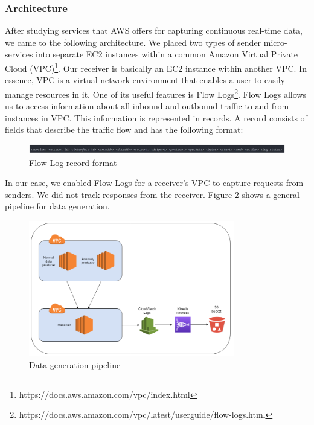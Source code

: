         \subsubsection{Architecture}
        After studying services that AWS offers for capturing continuous real-time data, we came to the following architecture. We placed two types of sender micro-services into separate EC2 instances within a common Amazon Virtual Private Cloud (VPC)\footnote{ https://docs.aws.amazon.com/vpc/index.html}. Our receiver is basically an EC2 instance within another VPC. In essence, VPC is a virtual network environment that enables a user to easily manage resources in it. One of its useful features is Flow Logs\footnote{ https://docs.aws.amazon.com/vpc/latest/userguide/flow-logs.html}. Flow Logs allows us to access information about all inbound and outbound traffic to and from instances in VPC. This information is represented in records. A record  consists of fields that describe the traffic flow and has the following format:
            \begin{figure}[h]
                \centering
                \includegraphics[width=1\textwidth]{images/flow-log-format.png}
                \caption{Flow Log record format}
                \label{fig:flow-log-format}
            \end{figure}
        \FloatBarrier
        
        In our case, we enabled Flow Logs for a receiver's VPC to capture requests from senders. We did not track responses from the receiver. Figure \ref{fig:data_generation_pipeline} shows a general pipeline for data generation. 
         \begin{figure}[h]
            \centering
            \includegraphics[width=0.8\textwidth]{images/data-generation-pipeline.png}
            \caption{Data generation pipeline}
            \label{fig:data_generation_pipeline}
        \end{figure}
        \FloatBarrier
        
